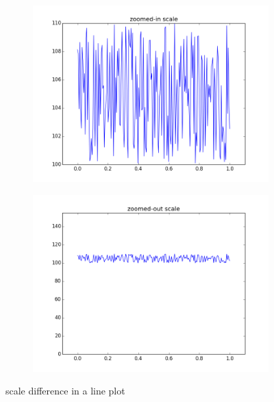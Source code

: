 \begin{figure}[h]
\centering
\begin{subfigure}{.4\textwidth}
\centering
\includegraphics[width=\textwidth]{scale_line_zoomed_in.png}
\end{subfigure}
\begin{subfigure}{.4\textwidth}
\centering
\includegraphics[width=\textwidth]{scale_line_zoomed_out.png}
\end{subfigure}
\caption{scale difference in a line plot}
\label{fig:scale_line}
\end{figure}



